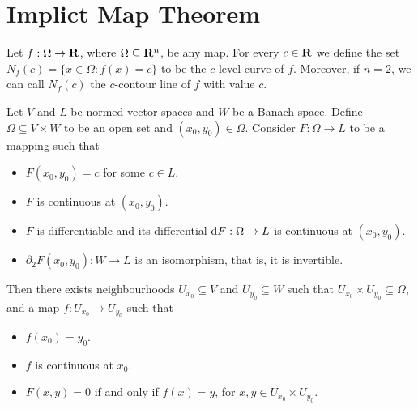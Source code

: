 \section{Implict Map Theorem}

\begin{definition}
  \label{def:level-curve}
  Let \(f: \Omega \to \mathbf{R}\), where \(\Omega \subseteq \mathbf{R}^n\), be any map. For every \(c \in \mathbf{R}\) we
  define the set \(N_f(c) = \{x \in \Omega : f(x) = c\}\) to be the \(c\)-level curve of
  \(f\). Moreover, if \(n = 2\), we can call \(N_f(c)\) the \(c\)-contour line of
  \(f\) with value \(c\).
\end{definition}

\begin{theorem}
  \label{thm:implicit-map}
  Let \(V\) and \(L\) be normed vector spaces and \(W\) be a Banach
  space. Define \(\Omega \subseteq V \times W\) to be an open set and \((x_0, y_0) \in \Omega\). Consider
  \(F: \Omega \to L\) to be a mapping such that
  \begin{itemize}\setlength\itemsep{0em}
    \item \(F(x_0, y_0) = c\) for some \(c \in L\).
    \item \(F\) is continuous at \((x_0, y_0)\).
    \item \(F\) is differentiable and its differential \(\mathrm{d} F: \Omega \to L\)
      is continuous at \((x_0, y_0)\).
    \item \(\partial_2F(x_0, y_0): W \to L\) is an isomorphism, that is, it is invertible.
  \end{itemize}
  Then there exists neighbourhoods \(U_{x_0} \subseteq V\) and \(U_{y_0} \subseteq W\) such that
  \(U_{x_0} \times U_{y_0} \subseteq \Omega\), and a map \(f: U_{x_0} \to U_{y_0}\) such that
  \begin{itemize}\setlength\itemsep{0em}
    \item \(f(x_0) = y_0\).
    \item \(f\) is continuous at \(x_0\).
    \item \(F(x, y) = 0\) if and only if \(f(x) = y\), for \(x, y \in U_{x_0} \times
    U_{y_0}\).
  \end{itemize}
\end{theorem}

